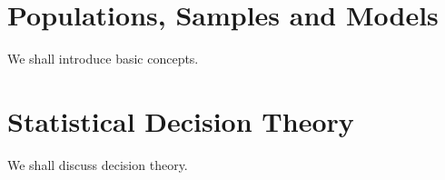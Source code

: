 \documentclass[thmcnt=section, 12pt]{elegantbook}
\begin{document}

\section{Populations, Samples and Models}

\par We shall introduce basic concepts.


\section{Statistical Decision Theory}

\par We shall discuss decision theory.


\printindex

\end{document}
